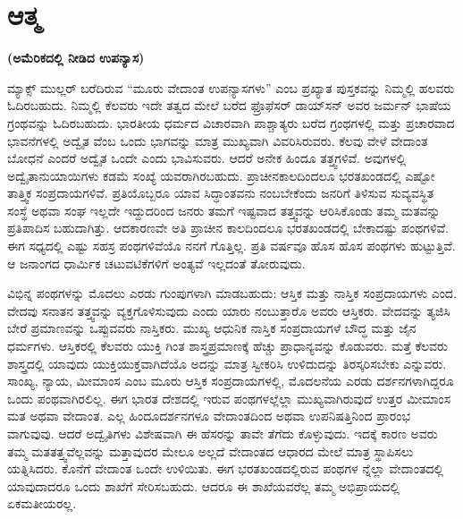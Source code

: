 \chapter{ಆತ್ಮ}

\centerline{\textbf{(ಅಮೆರಿಕದಲ್ಲಿ ನೀಡಿದ ಉಪನ್ಯಾಸ)}}

ಮ್ಯಾಕ್ಸ್​ ಮುಲ್ಲರ್​ ಬರೆದಿರುವ “ಮೂರು ವೇದಾಂತ ಉಪನ್ಯಾಸಗಳು” ಎಂಬ ಪ್ರಖ್ಯಾತ ಪುಸ್ತಕವನ್ನು ನಿಮ್ಮಲ್ಲಿ ಹಲವರು ಓದಿರಬಹುದು. ನಿಮ್ಮಲ್ಲಿ ಕೆಲವರು ಇದೇ ತತ್ವದ ಮೇಲೆ ಬರೆದ ಫ್ರೊಫೆಸರ್​ ಡಾಯ್​ಸನ್​ ಅವರ ಜರ್ಮನ್​ ಭಾಷೆಯ ಗ್ರಂಥವನ್ನು ಓದಿರಬಹುದು. ಭಾರತೀಯ ಧರ್ಮದ ವಿಚಾರವಾಗಿ ಪಾಶ್ಚಾತ್ಯರು ಬರೆದ ಗ್ರಂಥಗಳಲ್ಲಿ ಮತ್ತು ಪ್ರಚಾರವಾದ ಭಾವನೆಗಳಲ್ಲಿ ಅದ್ವೈತ ವೆಂಬ ಒಂದು ಭಾಗವನ್ನು ಮಾತ್ರ ಮುಖ್ಯವಾಗಿ ವಿವರಿಸಿರುವರು. ಕೆಲವು ವೇಳೆ ವೇದಾಂತ ಬೋಧನೆ ಎಂದರೆ ಅದ್ವೈತ ಒಂದೇ ಎಂದು ಭಾವಿಸುವರು. ಆದರೆ ಅನೇಕ ಹಿಂದೂ ತತ್ತ್ವಗಳಿವೆ. ಅವುಗಳಲ್ಲಿ ಅದ್ವೈತಾನುಯಾಯಿಗಳು ಕಡಮೆ ಸಂಖ್ಯೆ ಯವರಾಗಿರಬಹುದು. ಪ್ರಾಚೀನಕಾಲದಿಂದಲೂ ಭರತಖಂಡದಲ್ಲಿ ಎಷ್ಟೋ ತಾತ್ತ್ವಿಕ ಸಂಪ್ರದಾಯಗಳಿವೆ. ಪ್ರತಿಯೊಬ್ಬರೂ ಯಾವ ಸಿದ್ಧಾಂತವನು ನಂಬಬೇಕೆಂದು ಜನರಿಗೆ ತಿಳಿಸುವ ಸುವ್ಯವಸ್ಥಿತ ಸಂಸ್ಥೆ ಅಥವಾ ಸಂಘ ಇಲ್ಲದೇ ಇದ್ದುದರಿಂದ ಜನರು ತಮಗೆ ಇಷ್ಟವಾದ ತತ್ತ್ವವನ್ನು ಆರಿಸಿಕೊಂಡು ತಮ್ಮ ಮತವನ್ನು ಪ್ರತಿಪಾದಿಸ ಬಹುದಾಗಿತ್ತು. ಆದಕಾರಣವೇ ಅತಿ ಪ್ರಾಚೀನ ಕಾಲದಿಂದಲೂ ಭರತಖಂಡದಲ್ಲಿ ಬೇಕಾದಷ್ಟು ಪಂಥಗಳಿವೆ. ಈಗ ಸಧ್ಯದಲ್ಲಿ ಎಷ್ಟು ಸಹಸ್ರ ಪಂಥಗಳಿವೆಯೊ ನನಗೆ ಗೊತ್ತಿಲ್ಲ. ಪ್ರತಿ ವರ್ಷವೂ ಹೊಸ ಹೊಸ ಪಂಥಗಳು ಹುಟ್ಟುತ್ತಿವೆ. ಆ ಜನಾಂಗದ ಧಾರ್ಮಿಕ ಚಟುವಟಿಕೆಗಳಿಗೆ ಅಂತ್ಯವೆ ಇಲ್ಲದಂತೆ ತೋರುವುದು.

ವಿಭಿನ್ನ ಪಂಥಗಳನ್ನು ಮೊದಲು ಎರಡು ಗುಂಪುಗಳಾಗಿ ಮಾಡಬಹುದು: ಆಸ್ತಿಕ ಮತ್ತು ನಾಸ್ತಿಕ ಸಂಪ್ರದಾಯಗಳು ಎಂದ. ವೇದವು ಸನಾತನ ತತ್ತ್ವವನ್ನು ವ್ಯಕ್ತಗೊಳಿಸುವುದು ಎಂದು ಯಾರು ನಂಬುತ್ತಾರೊ ಅವರು ಆಸ್ತಿಕರು. ವೇದವನ್ನು ತ್ಯಜಿಸಿ ಬೇರೆ ಪ್ರಮಾಣವನ್ನು ಒಪ್ಪುವವರು ನಾಸ್ತಿಕರು. ಮುಖ್ಯ ಆಧುನಿಕ ನಾಸ್ತಿಕ ಸಂಪ್ರದಾಯಗಳೆ ಬೌದ್ಧ ಮತ್ತು ಜೈನ ಧರ್ಮಗಳು. ಆಸ್ತಿಕರಲ್ಲಿ ಕೆಲವರು ಯುಕ್ತಿ ಗಿಂತ ಶಾಸ್ತ್ರಪ್ರಮಾಣಕ್ಕೆ ಹೆಚ್ಚು ಪ್ರಾಧಾನ್ಯವನ್ನು ಕೊಡುವರು. ಮತ್ತೆ ಕೆಲವರು ಶಾಸ್ತ್ರದಲ್ಲಿ ಯಾವುದು ಯುಕ್ತಿಯುಕ್ತವಾಗಿದೆಯೊ ಅದನ್ನು ಮಾತ್ರ ಸ್ವೀಕರಿಸಿ ಉಳಿದುದನ್ನು ತಿರಸ್ಕರಿಸಬೇಕು ಎನ್ನುವರು. ಸಾಂಖ್ಯ, ನ್ಯಾಯ, ಮೀಮಾಂಸ ಎಂಬ ಮೂರು ಆಸ್ತಿಕ ಸಂಪ್ರದಾಯಗಳಲ್ಲಿ, ಮೊದಲನೆಯ ಎರಡು ದರ್ಶನಗಳಾಗಿದ್ದರೂ ಒಂದು ಪಂಥವಾಗಿರಲಿಲ್ಲ. ಈಗ ಭಾರತ ದೇಶದಲ್ಲಿ ಇರುವ ಪಂಥಗಳಲ್ಲೆಲ್ಲಾ ಮುಖ್ಯವಾಗಿರುವುದೆ ಉತ್ತರ ಮೀಮಾಂಸ ಮತ ಅಥವಾ ವೇದಾಂತ. ಎಲ್ಲ ಹಿಂದೂದರ್ಶನಗಳೂ ವೇದಾಂತದಿಂದ ಅಥವಾ ಉಪನಿಷತ್ತಿನಿಂದ ಪ್ರಾರಂಭ ವಾಗುವುವು. ಆದರೆ ಅದ್ವೈತಿಗಳು ವಿಶೇಷವಾಗಿ ಈ ಹೆಸರನ್ನು ತಾವೇ ತೆಗೆದು ಕೊಳ್ಳುವುದು. ಇದಕ್ಕೆ ಕಾರಣ ಅವರು ತಮ್ಮ ಮತತತ್ತ್ವವೆಲ್ಲವನ್ನು ಮತ್ತಾವುದರ ಮೇಲೂ ಅಲ್ಲದೆ ವೇದಾಂತದ ಆಧಾರದ ಮೇಲೆ ಮಾತ್ರ ಸ್ಥಾಪಿಸಲು ಯತ್ನಿಸಿದರು. ಕೊನೆಗೆ ವೇದಾಂತ ಒಂದೇ ಉಳಿಯಿತು. ಈಗ ಭರತಖಂಡದಲ್ಲಿರುವ ಪಂಥಗಳ ನ್ನೆಲ್ಲಾ ವೇದಾಂತದಲ್ಲಿ ಯಾವುದಾದರೂ ಒಂದು ಶಾಖೆಗೆ ಸೇರಿಸಬಹುದು. ಆದರೂ ಈ ಶಾಖೆಯವರೆಲ್ಲ ತಮ್ಮ ಅಭಿಪ್ರಾಯದಲ್ಲಿ ಏಕಮತೀಯರಲ್ಲ.

